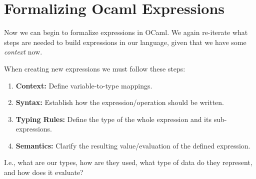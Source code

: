 \section{Formalizing Ocaml Expressions}

Now we can begin to formalize expressions
in OCaml. We again re-iterate what steps are needed to build expressions
in our language, given that we have some \textit{context} now.

\begin{Def}

    When creating new expressions we must follow these steps:
    \begin{enumerate}
        \item \textbf{Context:} Define variable-to-type mappings.
        \item \textbf{Syntax:} Establish how the expression/operation should be written.
        \item \textbf{Typing Rules:} Define the type of the whole expression and its sub-expressions.
        \item \textbf{Semantics:} Clarify the resulting value/evaluation of the defined expression.
    \end{enumerate}
    I.e., what are our types, how are they used, what type of data do they represent, and how does it evaluate?
\end{Def}

